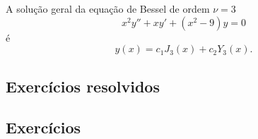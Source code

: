 \begin{ex}
  A solução geral da equação de Bessel de ordem $\nu=3$
  \begin{equation}
    x^2y'' + xy' + \left(x^2 - 9\right)y = 0
  \end{equation}
  é
  \begin{equation}
    y(x) = c_1J_{3}(x) + c_2Y_3(x).
  \end{equation}  
\end{ex}

\subsection*{Exercícios resolvidos}

\emconstrucao

\subsection*{Exercícios}

\emconstrucao